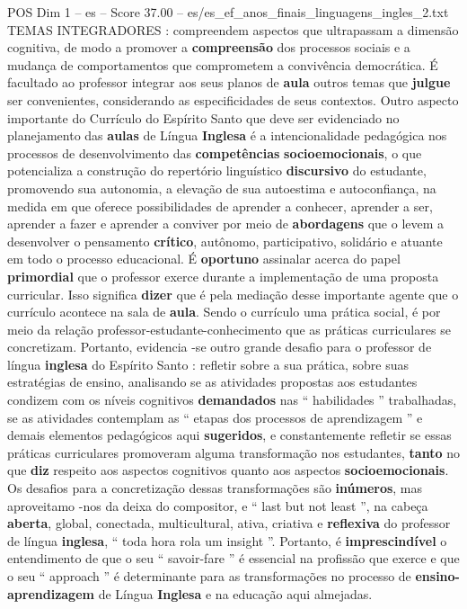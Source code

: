 \begin{textsample}{POS Dim 1 – es – Score 37.00 – es/es\_ef\_anos\_finais\_linguagens\_ingles\_2.txt}
TEMAS INTEGRADORES : compreendem aspectos que ultrapassam a dimensão cognitiva, de modo a promover a \textbf{compreensão} dos processos sociais e a mudança de comportamentos que comprometem a convivência democrática.
É facultado ao professor integrar aos seus planos de \textbf{aula} outros temas que \textbf{julgue} ser convenientes, considerando as especificidades de seus contextos.
Outro aspecto importante do Currículo do Espírito Santo que deve ser evidenciado no planejamento das \textbf{aulas} de Língua \textbf{Inglesa} é a intencionalidade pedagógica nos processos de desenvolvimento das \textbf{competências} \textbf{socioemocionais}, o que potencializa a construção do repertório linguístico \textbf{discursivo} do estudante, promovendo sua autonomia, a elevação de sua autoestima e autoconfiança, na medida em que oferece possibilidades de aprender a conhecer, aprender a ser, aprender a fazer e aprender a conviver por meio de \textbf{abordagens} que o levem a desenvolver o pensamento \textbf{crítico}, autônomo, participativo, solidário e atuante em todo o processo educacional.
É \textbf{oportuno} assinalar acerca do papel \textbf{primordial} que o professor exerce durante a implementação de uma proposta curricular.
Isso significa \textbf{dizer} que é pela mediação desse importante agente que o currículo acontece na sala de \textbf{aula}.
Sendo o currículo uma prática social, é por meio da relação professor-estudante-conhecimento que as práticas curriculares se concretizam.
Portanto, evidencia -se outro grande desafio para o professor de língua \textbf{inglesa} do Espírito Santo : refletir sobre a sua prática, sobre suas estratégias de ensino, analisando se as atividades propostas aos estudantes condizem com os níveis cognitivos \textbf{demandados} nas “ habilidades ” trabalhadas, se as atividades contemplam as “ etapas dos processos de aprendizagem ” e demais elementos pedagógicos aqui \textbf{sugeridos}, e constantemente refletir se essas práticas curriculares promoveram alguma transformação nos estudantes, \textbf{tanto} no que \textbf{diz} respeito aos aspectos cognitivos quanto aos aspectos \textbf{socioemocionais}.
Os desafios para a concretização dessas transformações são \textbf{inúmeros}, mas aproveitamo -nos da deixa do compositor, e “ last but not least ”, na cabeça \textbf{aberta}, global, conectada, multicultural, ativa, criativa e \textbf{reflexiva} do professor de língua \textbf{inglesa}, “ toda hora rola um insight ”.
Portanto, é \textbf{imprescindível} o entendimento de que o seu “ savoir-fare ” é essencial na profissão que exerce e que o seu “ approach ” é determinante para as transformações no processo de \textbf{ensino-aprendizagem} de Língua \textbf{Inglesa} e na educação aqui almejadas.

\end{textsample}
